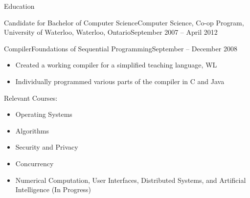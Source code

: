 \documentclass[11pt]{article}
\begin{document}
\begin{section}{Education}
\begin{subsection}{Candidate for Bachelor of Computer Science}{Computer Science, Co-op Program, University of Waterloo, Waterloo, Ontario}{September 2007 -- April 2012}
\begin{indent}
\begin{subsection}{Compiler}{Foundations of Sequential Programming}{September -- December 2008}
					\begin{itemize}
						\item Created a working compiler for a simplified teaching language, WL
						\item Individually programmed various parts of the compiler in C and Java
					\end{itemize}

				\end{subsection}

				\begin{bf}Relevant Courses:\end{bf}

				\begin{itemize}
                    \item Operating Systems
                    \item Algorithms
                    \item Security and Privacy
                    \item Concurrency
                    \item Numerical Computation, User Interfaces, Distributed Systems, and Artificial Intelligence (In Progress)
				\end{itemize}
			\end{indent}

		\end{subsection}

	\end{section}
\end{document}
